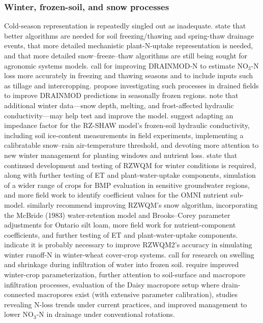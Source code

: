 \documentclass[11pt]{article}
\begin{document}
\subsubsection{Winter, frozen-soil, and snow processes}
Cold-season representation is repeatedly singled out as inadequate. \textcite{Feyereisen2006b} state that better algorithms are needed for soil freezing/thawing and spring-thaw drainage events, that more detailed mechanistic plant-N-uptake representation is needed, and that more detailed snow--freeze--thaw algorithms are still being sought for agronomic systems models. \textcite{Yang2007} call for improving DRAINMOD-N to estimate NO$_3$-N loss more accurately in freezing and thawing seasons and to include inputs such as tillage and intercropping. \textcite{Saadat2020} propose investigating such processes in drained fields to improve DRAINMOD predictions in seasonally frozen regions. \textcite{Jiang2020} note that additional winter data---snow depth, melting, and frost-affected hydraulic conductivity---may help test and improve the model. \textcite{Li2024b} suggest adapting an impedance factor for the RZ-SHAW model's frozen-soil hydraulic conductivity, including soil ice-content measurements in field experiments, implementing a calibratable snow--rain air-temperature threshold, and devoting more attention to new winter management for planting windows and nutrient loss. \textcite{Ahmed2007b} state that continued development and testing of RZWQM for winter conditions is required, along with further testing of ET and plant-water-uptake components, simulation of a wider range of crops for BMP evaluation in sensitive groundwater regions, and more field work to identify coefficient values for the OMNI nutrient sub-model. \textcite{Ahmed2007} similarly recommend improving RZWQM's snow algorithm, incorporating the McBride (1983) water-retention model and Brooks--Corey parameter adjustments for Ontario silt loam, more field work for nutrient-component coefficients, and further testing of ET and plant-water-uptake components. \textcite{Yang2021} indicate it is probably necessary to improve RZWQM2's accuracy in simulating winter runoff-N in winter-wheat cover-crop systems. \textcite{Roy2020} call for research on swelling and shrinkage during infiltration of water into frozen soil. \textcite{Motarjemi2021} require improved winter-crop parameterization, further attention to soil-surface and macropore infiltration processes, evaluation of the Daisy macropore setup where drain-connected macropores exist (with extensive parameter calibration), studies revealing N-loss trends under current practices, and improved management to lower NO$_3$-N in drainage under conventional rotations.
\end{document}
